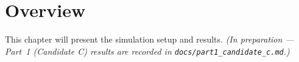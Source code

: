 \section{Overview}
This chapter will present the simulation setup and results. \emph{(In preparation --- Part~1 (Candidate C) results are recorded in \texttt{docs/part1\_candidate\_c.md}.)}
